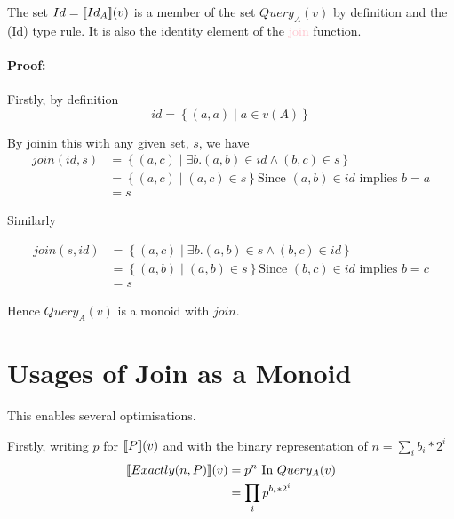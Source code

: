 \documentclass[12pt,a4paper,twoside,openright]{report}
\newcommand\mathName[1]{\textcolor{pink}{#1}}
\newcommand{\db}[1]{{\bf [\![}#1{\bf ]\!]}}
\newcommand{\deno}[1]{\db{#1}(v)}
\newcommand{\setComp}[2]{\left\lbrace #1 \mid #2 \right\rbrace}
\newcommand{\queryT}[1]{Query_{#1}(v)}
\begin{document}
The set $Id = \deno{Id_A}$ is a member of the set $\queryT{A}$ by definition and the (Id) type rule. It is also the identity element of the \mathName{join} function.

\paragraph{Proof:} Firstly, by definition
\[ id = \setComp{(a, a)}{a \in v(A)}\]

By joinin this with any given set, $s$, we have
\begin{equation}
\label{LeftID}
\begin{split}
join(id, s) & = \setComp{(a, c)}{\exists b. (a, b) \in id \wedge (b, c) \in s}\\
            & = \setComp{(a, c)}{(a, c) \in s} \mbox{Since $(a, b) \in id$ implies $b = a$}\\
            & = s
\end{split}
\end{equation}

Similarly

\begin{equation}
\label{RightID}
\begin{split}
join(s, id) & = \setComp{(a, c)}{\exists b. (a, b) \in s \wedge (b, c) \in id}\\
            & = \setComp{(a, b)}{(a, b) \in s} \mbox{Since $(b, c) \in id$ implies $b = c$}\\
            & = s
\end{split}
\end{equation}



Hence $\queryT{A}$ is a monoid with $join$. 
	
\section{Usages of Join as a Monoid}
\label{exactlyOpt}
This enables several optimisations.

Firstly, writing $p$ for $\deno{P}$ and with the binary representation of $n = \sum_i{b_i * 2^{i}}$
\begin{equation}\label{ExactlyReordering}
\begin{split}
\deno{Exactly(n, P)} & = p^{n} \mbox{ In $\queryT{A}$}\\
					& = \prod_i {p^{b_i * 2^i} }
\end{split}
\end{equation}
\end{document}
